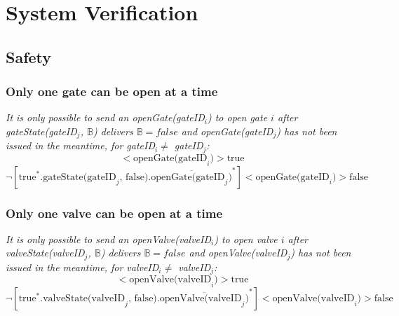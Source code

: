 \section{System Verification}
\subsection{Safety}
\subsubsection{Only one gate can be open at a time}
\textit{It is only possible to send an openGate(gateID$_i$) to open gate $i$ after gateState(gateID$_j$, $ \mathbb{B} $) delivers $\mathbb{B} = false$ and openGate(gateID$_j$) has not been issued in the meantime, for gateID$_i \neq$ gateID$_j$:}\\
	\begin{equation*}
		[\textrm{true}^*.\textrm{gateState(gateID}_j\textrm{, false}).\overline{\textrm{openGate(gateID}_j)}^*]<\textrm{openGate(gateID}_i)>\textrm{true}
	\end{equation*}
	\begin{equation*}
		\neg[\textrm{true}^*.\textrm{gateState(gateID}_j\textrm{, false}).\overline{\textrm{openGate(gateID}_j)}^*]<\textrm{openGate(gateID}_i)>\textrm{false}
	\end{equation*}
	
	
\subsubsection{Only one valve can be open at a time}
\textit{It is only possible to send an openValve(valveID$_i$) to open valve $i$ after valveState(valveID$_j$, $ \mathbb{B} $) delivers $\mathbb{B} = false$ and openValve(valveID$_j$) has not been issued in the meantime, for valveID$_i \neq$ valveID$_j$:}\\
	\begin{equation*}
		[\textrm{true}^*.\textrm{valveState(valveID}_j\textrm{, false}).\overline{\textrm{openValve(valveID}_j)}^*]<\textrm{openValve(valveID}_i)>\textrm{true}
	\end{equation*}
	\begin{equation*}
		\neg[\textrm{true}^*.\textrm{valveState(valveID}_j\textrm{, false}).\overline{\textrm{openValve(valveID}_j)}^*]<\textrm{openValve(valveID}_i)>\textrm{false}
	\end{equation*}
	
